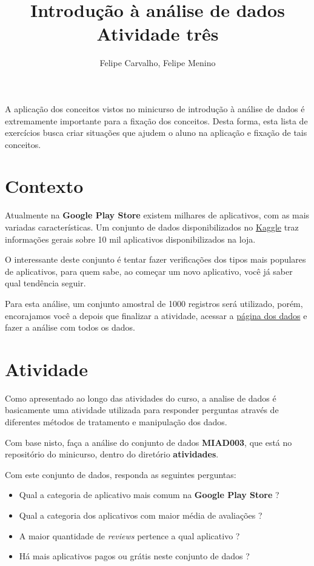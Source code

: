 \documentclass[12pt]{article}
\title{Introdução à análise de dados\\ Atividade três}
\author{Felipe Carvalho\inst{1}, Felipe Menino\inst{1}}
\begin{document}
 

\maketitle
     
\begin{resumo} 
    A aplicação dos conceitos vistos no minicurso de introdução à análise de dados é extremamente importante para a fixação dos conceitos. Desta forma, esta lista de exercícios busca criar situações que ajudem o aluno na aplicação e fixação de tais conceitos.
\end{resumo}

\section{Contexto}

Atualmente na \textbf{Google Play Store} existem milhares de aplicativos, com as mais variadas características. Um conjunto de dados disponibilizados no \href{https://www.kaggle.com/}{Kaggle} traz informações gerais sobre 10 mil aplicativos disponibilizados na loja.

O interessante deste conjunto é tentar fazer verificações dos tipos mais populares de aplicativos, para quem sabe, ao começar um novo aplicativo, você já saber qual tendência seguir.

Para esta análise, um conjunto amostral de 1000 registros será utilizado, porém, encorajamos você a depois que finalizar a atividade, acessar a \href{https://www.kaggle.com/lava18/google-play-store-apps}{página dos dados} e fazer a análise com todos os dados.

\section{Atividade}

Como apresentado ao longo das atividades do curso, a analise de dados é basicamente uma atividade utilizada para responder perguntas através de diferentes métodos de tratamento e manipulação dos dados.

Com base nisto, faça a análise do conjunto de dados \textbf{MIAD003}, que está no repositório do minicurso, dentro do diretório \textbf{atividades}.

Com este conjunto de dados, responda as seguintes perguntas:

\begin{itemize}
    \item Qual a categoria de aplicativo mais comum na \textbf{Google Play Store} ?
    \item Qual a categoria dos aplicativos com maior média de avaliações ?
    \item A maior quantidade de \textit{reviews} pertence a qual aplicativo ?
    \item Há mais aplicativos pagos ou grátis neste conjunto de dados ?
\end{itemize}
\end{document}
